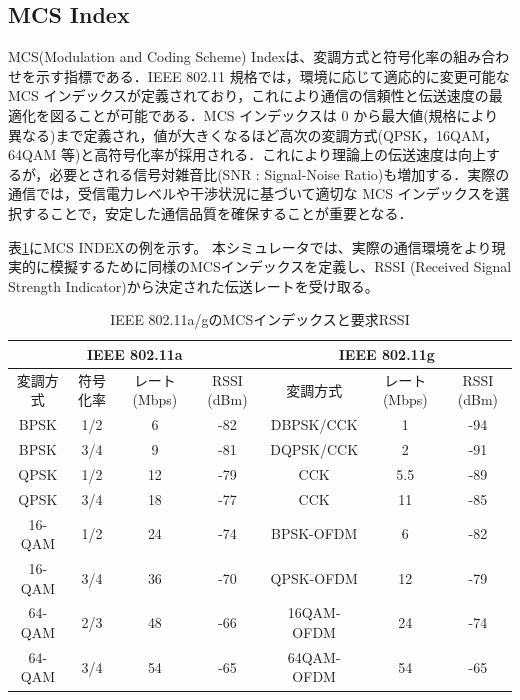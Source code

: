 \documentclass[a4paper,10pt]{ltjsarticle}
\begin{document}
\clearpage

\subsection{MCS Index}
MCS(Modulation and Coding Scheme) Indexは、変調方式と符号化率の組み合わせを示す指標である．IEEE 802.11 規格では，環境に応じて適応的に変更可能な MCS インデックスが定義されており，これにより通信の信頼性と伝送速度の最適化を図ることが可能である．MCS インデックスは 0 から最大値(規格により異なる)まで定義され，値が大きくなるほど高次の変調方式(QPSK，16QAM，64QAM 等)と高符号化率が採用される．これにより理論上の伝送速度は向上するが，必要とされる信号対雑音比(SNR : Signal-Noise Ratio)も増加する．実際の通信では，受信電力レベルや干渉状況に基づいて適切な MCS インデックスを選択することで，安定した通信品質を確保することが重要となる．

表\ref{table:mcs_11abg_rssi}にMCS INDEXの例を示す。
本シミュレータでは、実際の通信環境をより現実的に模擬するために同様のMCSインデックスを定義し、RSSI (Received Signal Strength Indicator)から決定された伝送レートを受け取る。\\


\begin{table}[H]
  \centering
  \caption{IEEE 802.11a/gのMCSインデックスと要求RSSI}
  \label{table:mcs_11abg_rssi}
  \begin{tabular}{c|c|c|c|c|c|c}
      \hline
      \multicolumn{4}{c|}{IEEE 802.11a} & \multicolumn{3}{c}{IEEE 802.11g} \\
      \hline
      変調方式 & 符号化率 & レート (Mbps) & RSSI (dBm) & 変調方式 & レート (Mbps) & RSSI (dBm) \\
      \hline
      BPSK & 1/2 & 6 & -82 & DBPSK/CCK & 1 & -94 \\
      BPSK & 3/4 & 9 & -81 & DQPSK/CCK & 2 & -91 \\
      QPSK & 1/2 & 12 & -79 & CCK & 5.5 & -89 \\
      QPSK & 3/4 & 18 & -77 & CCK & 11 & -85 \\
      16-QAM & 1/2 & 24 & -74 & BPSK-OFDM & 6 & -82 \\
      16-QAM & 3/4 & 36 & -70 & QPSK-OFDM & 12 & -79 \\
      64-QAM & 2/3 & 48 & -66 & 16QAM-OFDM & 24 & -74 \\
      64-QAM & 3/4 & 54 & -65 & 64QAM-OFDM & 54 & -65 \\
      \hline
  \end{tabular}
\end{table}
\end{document}
